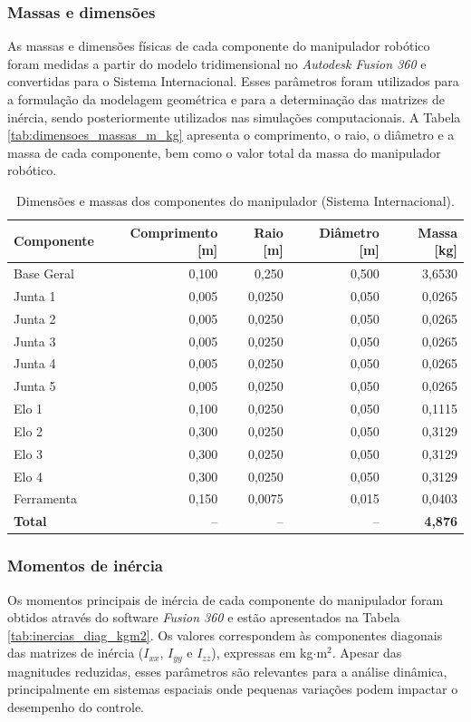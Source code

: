 \subsubsection{Massas e dimensões}
As massas e dimensões físicas de cada componente do manipulador robótico foram medidas a partir do modelo tridimensional no \emph{Autodesk Fusion 360} e convertidas para o Sistema Internacional. 
Esses parâmetros foram utilizados para a formulação da modelagem geométrica e para a determinação das matrizes de inércia, sendo posteriormente utilizados nas simulações computacionais. 
A Tabela \eqref{tab:dimensoes_massas_m_kg} apresenta o comprimento, o raio, o diâmetro e a massa de cada componente, bem como o valor total da massa do manipulador robótico.

\begin{table}[H]
\centering
\caption{Dimensões e massas dos componentes do manipulador (Sistema Internacional).}
\label{tab:dimensoes_massas_m_kg}
\begin{tabular}{l rrrr}
\hline
\textbf{Componente} & \textbf{Comprimento [m]} & \textbf{Raio [m]} & \textbf{Diâmetro [m]} & \textbf{Massa [kg]} \\
\hline
Base Geral   & 0{,}100 & 0{,}250  & 0{,}500 & 3{,}6530  \\
Junta 1      & 0{,}005 & 0{,}0250 & 0{,}050 & 0{,}0265 \\
Junta 2      & 0{,}005 & 0{,}0250 & 0{,}050 & 0{,}0265 \\
Junta 3      & 0{,}005 & 0{,}0250 & 0{,}050 & 0{,}0265 \\
Junta 4      & 0{,}005 & 0{,}0250 & 0{,}050 & 0{,}0265 \\
Junta 5      & 0{,}005 & 0{,}0250 & 0{,}050 & 0{,}0265 \\
Elo 1        & 0{,}100 & 0{,}0250 & 0{,}050 & 0{,}1115 \\
Elo 2        & 0{,}300 & 0{,}0250 & 0{,}050 & 0{,}3129 \\
Elo 3        & 0{,}300 & 0{,}0250 & 0{,}050 & 0{,}3129 \\
Elo 4        & 0{,}300 & 0{,}0250 & 0{,}050 & 0{,}3129 \\
Ferramenta   & 0{,}150 & 0{,}0075 & 0{,}015 & 0{,}0403 \\
\hline
\textbf{Total} & -- & -- & -- & \textbf{4{,}876} \\
\hline
\end{tabular}
\end{table}


\subsubsection{Momentos de inércia}
Os momentos principais de inércia de cada componente do manipulador foram obtidos através do software \emph{Fusion 360} e estão apresentados na Tabela \eqref{tab:inercias_diag_kgm2}. 
Os valores correspondem às componentes diagonais das matrizes de inércia ($I_{xx}$, $I_{yy}$ e $I_{zz}$), expressas em kg$\cdot$m$^{2}$. 
Apesar das magnitudes reduzidas, esses parâmetros são relevantes para a análise dinâmica, principalmente em sistemas espaciais onde pequenas variações podem impactar o desempenho do controle.

